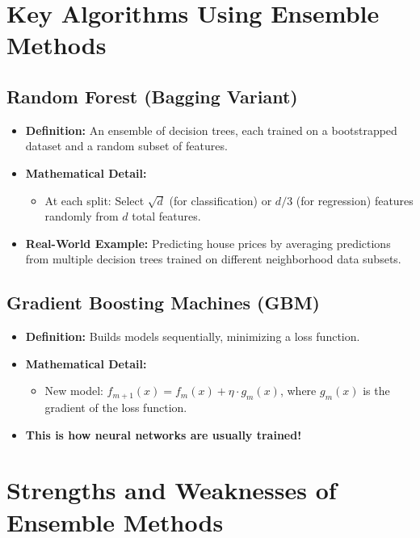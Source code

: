 \documentclass[10pt]{article}
\begin{document}
\section{Key Algorithms Using Ensemble Methods}

\subsection{Random Forest (Bagging Variant)}

\begin{itemize}
    \item \textbf{Definition:} An ensemble of decision trees, each trained on a bootstrapped dataset and a random subset of features.
    \item \textbf{Mathematical Detail:}
    \begin{itemize}
        \item At each split: Select \(\sqrt{d}\) (for classification) or \(d/3\) (for regression) features randomly from \(d\) total features.
    \end{itemize}
    \item \textbf{Real-World Example:} Predicting house prices by averaging predictions from multiple decision trees trained on different neighborhood data subsets.
\end{itemize}

\subsection{Gradient Boosting Machines (GBM)}

\begin{itemize}
    \item \textbf{Definition:} Builds models sequentially, minimizing a loss function.
    \item \textbf{Mathematical Detail:}
    \begin{itemize}
        \item New model: \( f_{m+1}(x) = f_m(x) + \eta \cdot g_m(x) \), where \(g_m(x)\) is the gradient of the loss function.
    \end{itemize}
    \item \textbf{This is how neural networks are usually trained!}
\end{itemize}

\section{Strengths and Weaknesses of Ensemble Methods}
\end{document}
